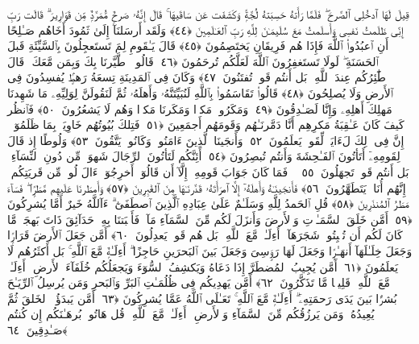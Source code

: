  قِيلَ لَهَا ٱدخُلِى ٱلصَّرحَ ۖ فَلَمَّا رَأَتهُ حَسِبَتهُ لُجَّةًۭ وَكَشَفَت عَن سَاقَيهَا ۚ قَالَ إِنَّهُۥ صَرحٌۭ مُّمَرَّدٌۭ مِّن قَوَارِيرَ ۗ قَالَت رَبِّ إِنِّى ظَلَمتُ نَفسِى وَأَسلَمتُ مَعَ سُلَيمَـٰنَ لِلَّهِ رَبِّ ٱلعَـٰلَمِينَ ﴿٤٤﴾
 وَلَقَد أَرسَلنَآ إِلَىٰ ثَمُودَ أَخَاهُم صَـٰلِحًا أَنِ ٱعبُدُوا۟ ٱللَّهَ فَإِذَا هُم فَرِيقَانِ يَختَصِمُونَ ﴿٤٥﴾
 قَالَ يَـٰقَومِ لِمَ تَستَعجِلُونَ بِٱلسَّيِّئَةِ قَبلَ ٱلحَسَنَةِ ۖ لَولَا تَستَغفِرُونَ ٱللَّهَ لَعَلَّكُم تُرحَمُونَ ﴿٤٦﴾
 قَالُوا۟ ٱطَّيَّرنَا بِكَ وَبِمَن مَّعَكَ ۚ قَالَ طَٰٓئِرُكُم عِندَ ٱللَّهِ ۖ بَل أَنتُم قَومٌۭ تُفتَنُونَ ﴿٤٧﴾
 وَكَانَ فِى ٱلمَدِينَةِ تِسعَةُ رَهطٍۢ يُفسِدُونَ فِى ٱلأَرضِ وَلَا يُصلِحُونَ ﴿٤٨﴾
 قَالُوا۟ تَقَاسَمُوا۟ بِٱللَّهِ لَنُبَيِّتَنَّهُۥ وَأَهلَهُۥ ثُمَّ لَنَقُولَنَّ لِوَلِيِّهِۦ مَا شَهِدنَا مَهلِكَ أَهلِهِۦ وَإِنَّا لَصَـٰدِقُونَ ﴿٤٩﴾
 وَمَكَرُوا۟ مَكرًۭا وَمَكَرنَا مَكرًۭا وَهُم لَا يَشعُرُونَ ﴿٥٠﴾
 فَٱنظُر كَيفَ كَانَ عَـٰقِبَةُ مَكرِهِم أَنَّا دَمَّرنَـٰهُم وَقَومَهُم أَجمَعِينَ ﴿٥١﴾
 فَتِلكَ بُيُوتُهُم خَاوِيَةًۢ بِمَا ظَلَمُوٓا۟ ۗ إِنَّ فِى ذَٟلِكَ لَءَايَةًۭ لِّقَومٍۢ يَعلَمُونَ ﴿٥٢﴾
 وَأَنجَينَا ٱلَّذِينَ ءَامَنُوا۟ وَكَانُوا۟ يَتَّقُونَ ﴿٥٣﴾
 وَلُوطًا إِذ قَالَ لِقَومِهِۦٓ أَتَأتُونَ ٱلفَـٰحِشَةَ وَأَنتُم تُبصِرُونَ ﴿٥٤﴾
 أَئِنَّكُم لَتَأتُونَ ٱلرِّجَالَ شَهوَةًۭ مِّن دُونِ ٱلنِّسَآءِ ۚ بَل أَنتُم قَومٌۭ تَجهَلُونَ ﴿٥٥﴾
 ۞ فَمَا كَانَ جَوَابَ قَومِهِۦٓ إِلَّآ أَن قَالُوٓا۟ أَخرِجُوٓا۟ ءَالَ لُوطٍۢ مِّن قَريَتِكُم ۖ إِنَّهُم أُنَاسٌۭ يَتَطَهَّرُونَ ﴿٥٦﴾
 فَأَنجَينَـٰهُ وَأَهلَهُۥٓ إِلَّا ٱمرَأَتَهُۥ قَدَّرنَـٰهَا مِنَ ٱلغَٰبِرِينَ ﴿٥٧﴾
 وَأَمطَرنَا عَلَيهِم مَّطَرًۭا ۖ فَسَآءَ مَطَرُ ٱلمُنذَرِينَ ﴿٥٨﴾
 قُلِ ٱلحَمدُ لِلَّهِ وَسَلَـٰمٌ عَلَىٰ عِبَادِهِ ٱلَّذِينَ ٱصطَفَىٰٓ ۗ ءَآللَّهُ خَيرٌ أَمَّا يُشرِكُونَ ﴿٥٩﴾
 أَمَّن خَلَقَ ٱلسَّمَـٰوَٟتِ وَٱلأَرضَ وَأَنزَلَ لَكُم مِّنَ ٱلسَّمَآءِ مَآءًۭ فَأَنۢبَتنَا بِهِۦ حَدَآئِقَ ذَاتَ بَهجَةٍۢ مَّا كَانَ لَكُم أَن تُنۢبِتُوا۟ شَجَرَهَآ ۗ أَءِلَـٰهٌۭ مَّعَ ٱللَّهِ ۚ بَل هُم قَومٌۭ يَعدِلُونَ ﴿٦٠﴾
 أَمَّن جَعَلَ ٱلأَرضَ قَرَارًۭا وَجَعَلَ خِلَـٰلَهَآ أَنهَـٰرًۭا وَجَعَلَ لَهَا رَوَٟسِىَ وَجَعَلَ بَينَ ٱلبَحرَينِ حَاجِزًا ۗ أَءِلَـٰهٌۭ مَّعَ ٱللَّهِ ۚ بَل أَكثَرُهُم لَا يَعلَمُونَ ﴿٦١﴾
 أَمَّن يُجِيبُ ٱلمُضطَرَّ إِذَا دَعَاهُ وَيَكشِفُ ٱلسُّوٓءَ وَيَجعَلُكُم خُلَفَآءَ ٱلأَرضِ ۗ أَءِلَـٰهٌۭ مَّعَ ٱللَّهِ ۚ قَلِيلًۭا مَّا تَذَكَّرُونَ ﴿٦٢﴾
 أَمَّن يَهدِيكُم فِى ظُلُمَـٰتِ ٱلبَرِّ وَٱلبَحرِ وَمَن يُرسِلُ ٱلرِّيَـٰحَ بُشرًۢا بَينَ يَدَى رَحمَتِهِۦٓ ۗ أَءِلَـٰهٌۭ مَّعَ ٱللَّهِ ۚ تَعَـٰلَى ٱللَّهُ عَمَّا يُشرِكُونَ ﴿٦٣﴾
 أَمَّن يَبدَؤُا۟ ٱلخَلقَ ثُمَّ يُعِيدُهُۥ وَمَن يَرزُقُكُم مِّنَ ٱلسَّمَآءِ وَٱلأَرضِ ۗ أَءِلَـٰهٌۭ مَّعَ ٱللَّهِ ۚ قُل هَاتُوا۟ بُرهَـٰنَكُم إِن كُنتُم صَـٰدِقِينَ ﴿٦٤﴾
